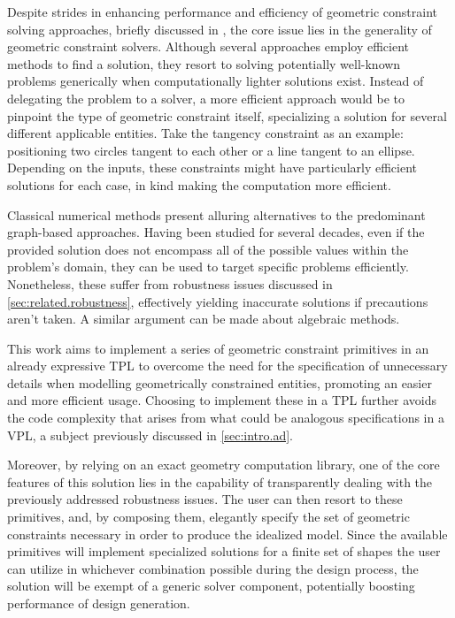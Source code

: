 %
\label{chap:solution}
\cleardoublepage{}


\noindent
Despite strides in enhancing performance and efficiency of geometric constraint
solving approaches, briefly discussed in , the core
issue lies in the generality of geometric constraint solvers.  Although several
approaches employ efficient methods to find a solution, they resort to solving
potentially well-known problems generically when computationally lighter
solutions exist.  Instead of delegating the problem to a solver, a more
efficient approach would be to pinpoint the type of geometric constraint itself,
specializing a solution for several different applicable entities.  Take the
tangency constraint as an example: positioning two circles tangent to each other
or a line tangent to an ellipse.  Depending on the inputs, these constraints
might have particularly efficient solutions for each case, in kind making the
computation more efficient.

Classical numerical methods present alluring alternatives to the predominant
graph-based approaches.  Having been studied for several decades, even if the
provided solution does not encompass all of the possible values within the
problem's domain, they can be used to target specific problems efficiently.
Nonetheless, these suffer from robustness issues discussed in
\cref{sec:related.robustness}, effectively yielding inaccurate solutions if
precautions aren't taken.  A similar argument can be made about algebraic
methods.

This work aims to implement a series of geometric constraint primitives in an
already expressive \ac{TPL} to overcome the need for the specification of
unnecessary details when modelling geometrically constrained entities, promoting
an easier and more efficient usage.  Choosing to implement these in a \ac{TPL}
further avoids the code complexity that arises from what could be analogous
specifications in a \ac{VPL}, a subject previously discussed in
\cref{sec:intro.ad}.

Moreover, by relying on an exact geometry computation library, one of the core
features of this solution lies in the capability of transparently dealing with
the previously addressed robustness issues.  The user can then resort to these
primitives, and, by composing them, elegantly specify the set of geometric
constraints necessary in order to produce the idealized model.  Since the
available primitives will implement specialized solutions for a finite set of
shapes the user can utilize in whichever combination possible during the design
process, the solution will be exempt of a generic solver component, potentially
boosting performance of design generation.

